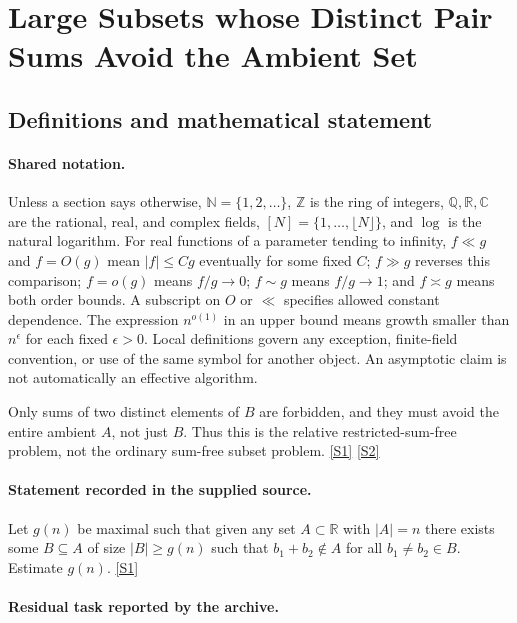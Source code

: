 \documentclass[11pt,a4paper]{article}
\newcommand{\N}{\mathbb{N}}
\newcommand{\Z}{\mathbb{Z}}
\newcommand{\Q}{\mathbb{Q}}
\newcommand{\R}{\mathbb{R}}
\newcommand{\C}{\mathbb{C}}
\newcommand{\sref}[2]{\hyperlink{source:#1:#2}{[S#2]}}
\begin{document}
\section{Large Subsets whose Distinct Pair Sums Avoid the Ambient Set}\label{statement}


\subsection{Definitions and mathematical statement}

\paragraph{Shared notation.}Unless a section says otherwise, $\N=\{1,2,\ldots\}$,
$\Z$ is the ring of integers, $\Q,\R,\C$ are the rational, real, and complex
fields, $[N]=\{1,\ldots,\lfloor N\rfloor\}$, and $\log$ is the natural
logarithm. For real functions of a parameter tending to infinity,
$f\ll g$ and $f=O(g)$ mean $|f|\leq Cg$ eventually for some fixed $C$;
$f\gg g$ reverses this comparison; $f=o(g)$ means $f/g\to0$;
$f\sim g$ means $f/g\to1$; and $f\asymp g$ means both order bounds.
A subscript on $O$ or $\ll$ specifies allowed constant dependence.
The expression $n^{o(1)}$ in an upper bound means growth smaller than
$n^\epsilon$ for each fixed $\epsilon>0$. Local definitions govern any
exception, finite-field convention, or use of the same symbol for another
object. An asymptotic claim is not automatically an effective algorithm.



Only sums of two distinct elements of $B$ are forbidden, and they must avoid the entire ambient $A$, not just $B$. Thus this is the relative restricted-sum-free problem, not the ordinary sum-free subset problem. \sref{statement}{1} \sref{statement}{2}

\paragraph{Statement recorded in the supplied source.}
Let $g(n)$ be maximal such that given any set $A\subset \mathbb{R}$ with $\lvert A\rvert=n$ there exists some $B\subseteq A$ of size $\lvert B\rvert\geq g(n)$ such that $b_1+b_2\not\in A$ for all $b_1\neq b_2\in B$.
Estimate $g(n)$. \sref{statement}{1}

\paragraph{Residual task reported by the archive.}
\end{document}
